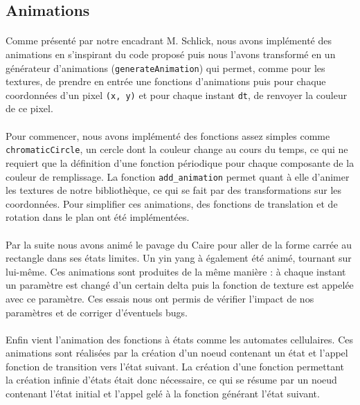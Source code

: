 \documentclass[a4paper]{article}
\begin{document}
\subsection{Animations}
\label{sec:animations}

\paragraph{}
Comme présenté par notre encadrant M. Schlick, nous avons implémenté des animations en s'inspirant du code proposé puis nous l'avons transformé en un générateur d'animations (\texttt{generateAnimation}) qui permet, comme pour les textures, de prendre en entrée une fonctions d'animations puis pour chaque coordonnées d'un pixel \texttt{(x, y)} et pour chaque instant \texttt{dt}, de renvoyer la couleur de ce pixel.

\paragraph{}
Pour commencer, nous avons implémenté des fonctions assez simples comme \texttt{chromaticCircle}, un cercle dont la couleur change au cours du temps, ce qui ne requiert que la définition d'une fonction périodique pour chaque composante de la couleur de remplissage. La fonction \texttt{add\_animation} permet quant à elle d'animer les textures de notre bibliothèque, ce qui se fait par des transformations sur les coordonnées. Pour simplifier ces animations, des fonctions de translation et de rotation dans le plan ont été implémentées.

\paragraph{}
Par la suite nous avons animé le pavage du Caire pour aller de la forme carrée au rectangle dans ses états limites. Un yin yang à également été animé, tournant sur lui-même. Ces animations sont produites de la même manière : à chaque instant un paramètre est changé d'un certain delta puis la fonction de texture est appelée avec ce paramètre. Ces essais nous ont permis de vérifier l'impact de nos paramètres et de corriger d'éventuels bugs.

\paragraph{}
Enfin vient l'animation des fonctions à états comme les automates cellulaires. Ces animations sont réalisées par la création d'un noeud contenant un état et l'appel fonction de transition vers l'état suivant. La création d'une fonction permettant la création infinie d'états était donc nécessaire, ce qui se résume par un noeud contenant l'état initial et l'appel gelé à la fonction générant l'état suivant.
\end{document}
